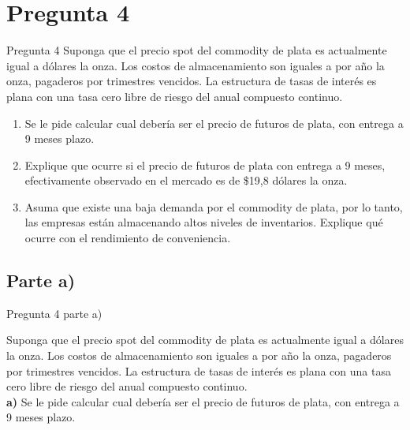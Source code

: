 \documentclass{beamer}
\begin{document}

\section{Pregunta 4}

\begin{frame}{Pregunta 4}
  \justify
  Suponga que el precio spot del commodity de plata es actualmente igual a \dinero{\plata} dólares  
  la onza. Los costos de almacenamiento son iguales a \dinero{\almacenamiento}por año la onza, pagaderos por
  trimestres vencidos. La estructura de tasas de interés es plana con una tasa cero libre 
  de riesgo del \porcentaje{\tlr} anual compuesto continuo.
  \begin{enumerate}[label=\textbf{\alph*)}]
  \item   Se le pide calcular cual debería ser el precio de futuros de plata, con entrega a 9 meses plazo.
  \item 	Explique que ocurre si el precio de futuros de plata con entrega a 9 meses,
  efectivamente observado en el mercado es de \$19,8 dólares la onza.
  \item 	Asuma que existe una baja demanda por el commodity de plata, por lo tanto, las empresas están 
  almacenando altos niveles de inventarios. Explique qué ocurre con el rendimiento de conveniencia.
  
\end{enumerate}
\end{frame}

\subsection{Parte a)}

\begin{frame}{Pregunta 4 parte a)}
  \justify

Suponga que el precio spot del commodity de plata es actualmente igual a \dinero{\plata} dólares  
la onza. Los costos de almacenamiento son iguales a \dinero{\almacenamiento} por año la onza, pagaderos por
trimestres vencidos. La estructura de tasas de interés es plana con una tasa cero libre 
de riesgo del \porcentaje{\tlr} anual compuesto continuo.\\
\vspace{.5em}
\textbf{a)} Se le pide calcular cual debería ser el precio de futuros de plata, con entrega a 9 meses plazo.

\end{frame}
\end{document}
